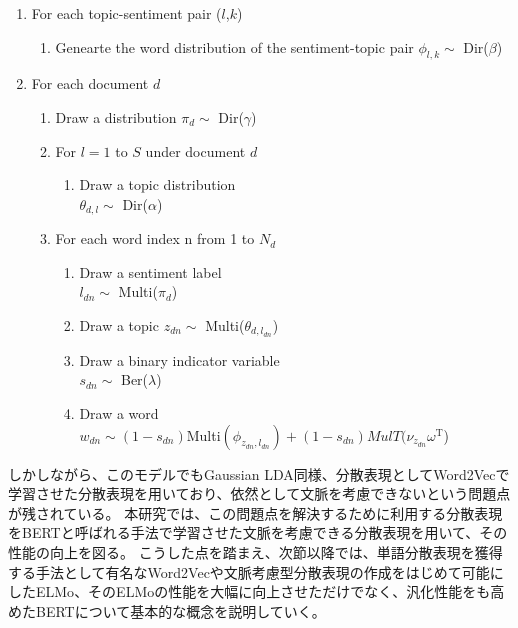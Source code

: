 \documentclass[uplatex]{jsarticle}
\begin{document}
\begin{enumerate}
    \item For each topic-sentiment pair ($l$,$k$)
          \begin{enumerate}
              \item Genearte the word distribution of the sentiment-topic pair $\phi_{l,k} \sim $ Dir($\beta$)
          \end{enumerate}
    \item For each document $d$
          \begin{enumerate}
              \item Draw a distribution $\pi_{d} \sim $ Dir($\gamma$)
              \item For $l=1$ to $S$ under document $d$
                    \begin{enumerate}
                        \item Draw a topic distribution \\ $ \theta_{d,l} \sim $ Dir($\alpha$)
                    \end{enumerate}
              \item For each word index n from 1 to $N_{d}$
                    \begin{enumerate}
                        \item Draw a sentiment label \\ $ l_{dn}  \sim$ Multi($\pi_{d}$)
                        \item Draw a topic $z_{dn} \sim $ Multi($\theta_{d, l_{dn}}$)
                        \item Draw a binary indicator variable \\ $s_{dn} \sim $ Ber($\lambda$)
                        \item Draw a word \\$w_{dn}  \sim (1-s_{dn})$Multi$(\phi_{z_{dn},l_{dn}})+(1 - s_{dn})MulT(\nu_{z_{dn}}\omega^{\mathrm{T}}$)
                    \end{enumerate}
          \end{enumerate}
\end{enumerate}

しかしながら、このモデルでもGaussian LDA\cite{Gaussian LDA}同様、分散表現としてWord2Vec\cite{Word2Vec}で学習させた分散表現を用いており、依然として文脈を考慮できないという問題点が残されている。
本研究では、この問題点を解決するために利用する分散表現をBERT\cite{BERT}と呼ばれる手法で学習させた文脈を考慮できる分散表現を用いて、その性能の向上を図る。
こうした点を踏まえ、次節以降では、単語分散表現を獲得する手法として有名なWord2Vec\cite{Word2Vec}や文脈考慮型分散表現の作成をはじめて可能にしたELMo\cite{ELMo}、そのELMoの性能を大幅に向上させただけでなく、汎化性能をも高めたBERT\cite{BERT}について基本的な概念を説明していく。
\end{document}

